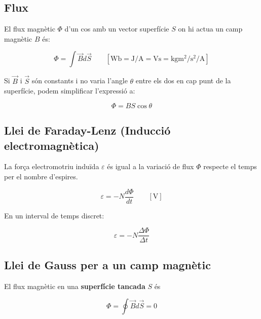 \pagebreak

\subsection{Flux}
\label{sub:flux}

El flux magnètic $\Phi$ d'un cos amb un vector superfície $S$ on hi actua un
camp magnètic $B$ és:

\begin{equation}
    \Phi = \int \vec{B}  d\vec{S} \qquad \left[ \si{\weber} = \si{\joule\per\ampere} = \si{\volt\second} = \si{\kilo \gram \metre \squared \per \second \squared \per \ampere} \right]
\end{equation}

Si $\vec{B}$ i $\vec{S}$ són constants i no varia l'angle $\theta$ entre els
dos en cap punt de la superfície, podem simplificar l'expressió a:

\begin{equation}
    \Phi = BS\cos\theta
\end{equation}

\subsection{Llei de Faraday-Lenz (Inducció electromagnètica)}
\label{sub:llei_de_faraday_lenz_induccio_electromagnetica}

La força electromotriu induïda $\varepsilon$ és igual a la variació de flux $\Phi$ respecte el temps per el nombre d'espires.

\begin{equation}
    \varepsilon = -N \frac{d\Phi}{dt} \qquad \left[\si{\volt}\right]
\end{equation}

En un interval de temps discret:

\begin{equation}
    \varepsilon = -N \frac{\Delta \Phi}{\Delta t}
\end{equation}

\subsection{Llei de Gauss per a un camp magnètic}
\label{sub:llei_de_gauss_per_a_un_camp_magnetic}

El flux magnètic en una \textbf{superfície tancada} $S$ és

\begin{equation}
    \Phi = \oint \vec{B} d\vec{S} = 0 
\end{equation}

